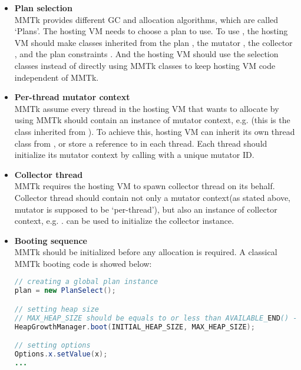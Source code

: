 \documentclass[12pt]{article}
\begin{document}
\begin{itemize}
\item
\textbf{Plan selection\\}
MMTk provides different GC and allocation algorithms, which
are called `Plans'. The hosting VM needs to choose
a plan to use. To use , 
the hosting VM should make  classes 
inherited from the plan , the mutator ,
the collector , and the plan
constraints . And the
hosting VM should use the selection classes instead of directly using
MMTk classes to keep hosting VM code independent of MMTk. 

\item
\textbf{Per-thread mutator context\\}
MMTk assume every thread in the hosting VM that wants to
allocate by using MMTk should contain an instance of 
mutator context, e.g. 
 (this is the  class
inherited from ). To
achieve this, hosting VM can inherit its own thread class
from , or store a reference to
 in each thread. Each thread
should initialize its mutator context by 
calling  with a unique 
mutator ID. 

\item
\textbf{Collector thread\\}
MMTk requires the hosting VM to spawn collector thread
on its behalf. Collector thread should contain not only
a mutator context(as stated above, mutator is supposed
to be `per-thread'), but also an instance of 
collector context, e.g. . 
can be used to initialize the collector instance. 

\item
\textbf{Booting sequence\\}
MMTk should be initialized before any allocation is required. 
A classical MMTk booting code is showed below:
\begin{lstlisting}[language=java]
// creating a global plan instance
plan = new PlanSelect();

// setting heap size
// MAX_HEAP_SIZE should be equals to or less than AVAILABLE_END() - AVAILABLE_START()
HeapGrowthManager.boot(INITIAL_HEAP_SIZE, MAX_HEAP_SIZE); 

// setting options
Options.x.setValue(x); 
...


\end{lstlisting}
\end{itemize}
\end{document}
